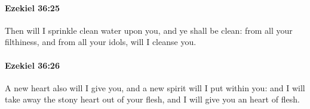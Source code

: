 		\paragraph{Ezekiel 36:25} %
			\label{EZEKIEL-36-25}

			Then will I sprinkle clean water upon you, and ye shall be clean: from all your filthiness, and from all your idols, will I cleanse you.


		\paragraph{Ezekiel 36:26} %
			\label{EZEKIEL-36-26}

			A new heart also will I give you, and a new spirit will I put within you: and I will take away the stony heart out of your flesh, and I will give you an heart of flesh.


